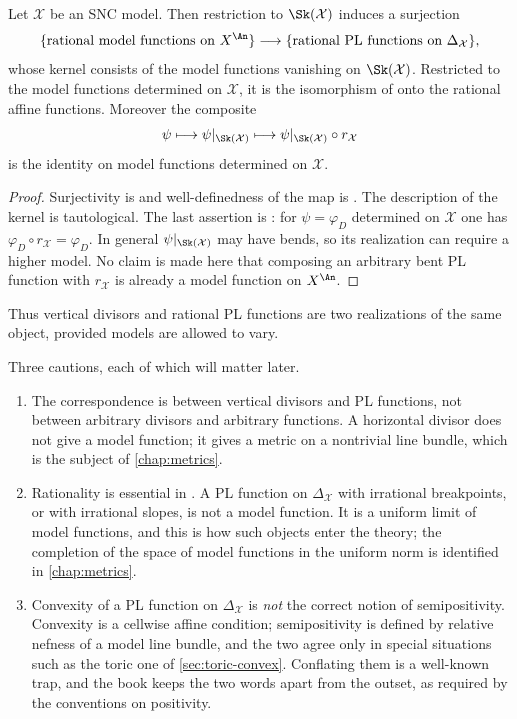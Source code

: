 \begin{corollary}
\label{cor:pl-model-function}
Let $\mathcal X$ be an SNC model. Then restriction to
$\Sk(\mathcal X)$ induces a surjection
\[
 \{\text{rational model functions on }X^{\An}\}
 \longrightarrow
 \{\text{rational PL functions on }\Delta_{\mathcal X}\},
\]
whose kernel consists of the model functions vanishing on
$\Sk(\mathcal X)$. Restricted to the model functions determined on
$\mathcal X$, it is the isomorphism of
 onto the rational affine functions.
Moreover the composite
\[
 \psi\longmapsto\psi|_{\Sk(\mathcal X)}\longmapsto
\psi|_{\Sk(\mathcal X)}\circ r_{\mathcal X}
\]
is the identity on model functions determined on $\mathcal X$.
\end{corollary}

\begin{proof}
Surjectivity is  and well-definedness of
the map is . The description of the kernel is
tautological. The last assertion is
: for $\psi=\varphi_D$ determined on
$\mathcal X$ one has $\varphi_D\circ r_{\mathcal X}=\varphi_D$.  In
general $\psi|_{\Sk(\mathcal X)}$ may have bends, so its realization can
require a higher model.  No claim is made here that composing an arbitrary
bent PL function with $r_{\mathcal X}$ is already a model function on
$X^{\An}$.
\end{proof}

Thus vertical divisors and rational PL functions are two realizations of the
same object, provided models are allowed to vary.

\begin{remark}
\label{rem:pl-scope}
Three cautions, each of which will matter later.
\begin{enumerate}
\item The correspondence is between vertical divisors and PL functions, not
  between arbitrary divisors and arbitrary functions. A horizontal divisor
  does not give a model function; it gives a metric on a nontrivial line
  bundle, which is the subject of \cref{chap:metrics}.
\item Rationality is essential in . A PL
  function on $\Delta_{\mathcal X}$ with irrational breakpoints, or with
  irrational slopes, is not a model function. It is a uniform limit of
  model functions, and this is how such objects enter the theory; the
  completion of the space of model functions in the uniform norm is
  identified in \cref{chap:metrics}.
\item Convexity of a PL function on $\Delta_{\mathcal X}$ is \emph{not}
  the correct notion of semipositivity. Convexity is a cellwise affine
  condition; semipositivity is defined by relative nefness of a
  model line bundle, and the two agree only in special situations such as
  the toric one of \cref{sec:toric-convex}. Conflating them is a
  well-known trap, and the book keeps the two words apart from the outset,
  as required by the conventions on positivity.
\end{enumerate}
\end{remark}

